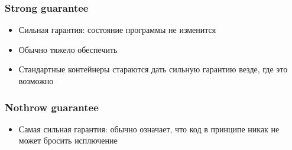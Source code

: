 \documentclass[10pt]{beamer}
\begin{document}
\begin{frame}[fragile]
\frametitle{Strong guarantee}
\begin{itemize}
\begin{tcblisting}{listing engine=minted, minted language=cpp, minted options={fontsize=\scriptsize}, listing only, colback=codebg, colframe=codebg, rounded corners}
void update(Array<int>& array) {
  Array<int> newArray(array.size());

  for (size_t i = 0; i < array.size(); ++i) {
    // Может бросить FileNotFoundError
    FileStream file(getFilename(i));
    newArray[i] = file.readNextInt();
  }
  
  // Идиома copy-and-swap
  array.swap(newArray);
}
\end{tcblisting}
\pause
\item Сильная гарантия: состояние программы не изменится
\pause
\item Обычно тяжело обеспечить
\pause
\item Стандартные контейнеры стараются дать сильную гарантию везде, где это возможно
\end{itemize}
\end{frame}

\begin{frame}[fragile]
\frametitle{Nothrow guarantee}
\begin{itemize}
\begin{tcblisting}{listing engine=minted, minted language=cpp, minted options={fontsize=\scriptsize}, listing only, colback=codebg, colframe=codebg, rounded corners}
int strlen(const char* str) {
  int result = 0;
  for (; *str != 0; ++str, ++result);
  return result;
}

vec2f rotate(vec2f vec, float angle) {
  float c = cos(angle);
  float s = sin(angle);
  return vec2f(
    c * vec.x - s * vec.y,
    s * vec.x + c * vec.y,
  );
}
\end{tcblisting}
\pause
\item Самая сильная гарантия: обычно означает, что код в принципе никак не может бросить исплючение
\end{itemize}
\end{frame}
\end{document}
